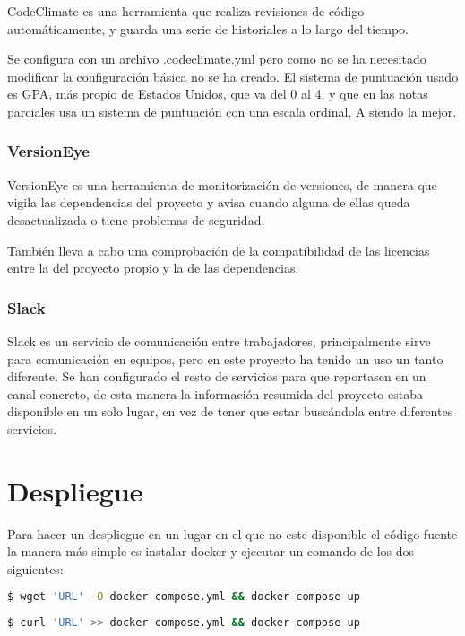 CodeClimate es una herramienta que realiza revisiones de código automáticamente, y guarda una serie de historiales a lo largo del tiempo. 

Se configura con un archivo .codeclimate.yml pero como no se ha necesitado modificar la configuración básica no se ha creado. El sistema de puntuación usado es GPA, más propio de Estados Unidos, que va del 0 al 4, y que en las notas parciales usa un sistema de puntuación con una escala ordinal, A siendo la mejor. 

\subsubsection{VersionEye}

VersionEye es una herramienta de monitorización de versiones, de manera que vigila las dependencias del proyecto y avisa cuando alguna de ellas queda desactualizada o tiene problemas de seguridad.

También lleva a cabo una comprobación de la compatibilidad de las licencias entre la del proyecto propio y la de las dependencias.

\subsubsection{Slack}

Slack es un servicio de comunicación entre trabajadores, principalmente sirve para comunicación en equipos, pero en este proyecto ha tenido un uso un tanto diferente. Se han configurado el resto de servicios para que reportasen en un canal concreto, de esta manera la información resumida del proyecto estaba disponible en un solo lugar, en vez de tener que estar buscándola entre diferentes servicios.

\section{Despliegue}

Para hacer un despliegue en un lugar en el que no este disponible el código fuente la manera más simple es instalar docker y ejecutar un comando de los dos siguientes:

\lstset{style=linestyle}
\begin{lstlisting}[language=bash]
$ wget 'URL' -O docker-compose.yml && docker-compose up
\end{lstlisting}

\lstset{style=linestyle}
\begin{lstlisting}[language=bash]
$ curl 'URL' >> docker-compose.yml && docker-compose up
\end{lstlisting}


